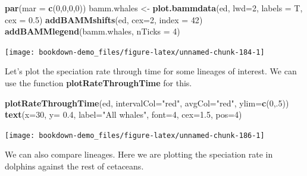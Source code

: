 \documentclass[
]{book}
\newenvironment{Shaded}{\begin{snugshade}}{\end{snugshade}}
\newcommand{\DataTypeTok}[1]{\textcolor[rgb]{0.13,0.29,0.53}{#1}}
\newcommand{\DecValTok}[1]{\textcolor[rgb]{0.00,0.00,0.81}{#1}}
\newcommand{\FloatTok}[1]{\textcolor[rgb]{0.00,0.00,0.81}{#1}}
\newcommand{\KeywordTok}[1]{\textcolor[rgb]{0.13,0.29,0.53}{\textbf{#1}}}
\newcommand{\NormalTok}[1]{#1}
\newcommand{\StringTok}[1]{\textcolor[rgb]{0.31,0.60,0.02}{#1}}
\begin{document}
\begin{Shaded}
\begin{Highlighting}[]
\KeywordTok{par}\NormalTok{(}\DataTypeTok{mar =} \KeywordTok{c}\NormalTok{(}\DecValTok{0}\NormalTok{,}\DecValTok{0}\NormalTok{,}\DecValTok{0}\NormalTok{,}\DecValTok{0}\NormalTok{))}
\NormalTok{bamm.whales \textless{}{-}}\StringTok{ }\KeywordTok{plot.bammdata}\NormalTok{(ed, }\DataTypeTok{lwd=}\DecValTok{2}\NormalTok{, }\DataTypeTok{labels =}\NormalTok{ T, }\DataTypeTok{cex =} \FloatTok{0.5}\NormalTok{)}
\KeywordTok{addBAMMshifts}\NormalTok{(ed, }\DataTypeTok{cex=}\DecValTok{2}\NormalTok{, }\DataTypeTok{index =} \DecValTok{42}\NormalTok{)}
\KeywordTok{addBAMMlegend}\NormalTok{(bamm.whales, }\DataTypeTok{nTicks =} \DecValTok{4}\NormalTok{)}
\end{Highlighting}
\end{Shaded}

\begin{center}\texttt{[image: bookdown-demo\_files/figure-latex/unnamed-chunk-184-1]} \end{center}

Let's plot the speciation rate through time for some lineages of interest. We can use the function \textbf{plotRateThroughTime} for this.

\begin{Shaded}
\begin{Highlighting}[]
\KeywordTok{plotRateThroughTime}\NormalTok{(ed, }\DataTypeTok{intervalCol=}\StringTok{"red"}\NormalTok{, }\DataTypeTok{avgCol=}\StringTok{"red"}\NormalTok{, }\DataTypeTok{ylim=}\KeywordTok{c}\NormalTok{(}\DecValTok{0}\NormalTok{,.}\DecValTok{5}\NormalTok{))}
\KeywordTok{text}\NormalTok{(}\DataTypeTok{x=}\DecValTok{30}\NormalTok{, }\DataTypeTok{y=} \FloatTok{0.4}\NormalTok{, }\DataTypeTok{label=}\StringTok{"All whales"}\NormalTok{, }\DataTypeTok{font=}\DecValTok{4}\NormalTok{, }\DataTypeTok{cex=}\FloatTok{1.5}\NormalTok{, }\DataTypeTok{pos=}\DecValTok{4}\NormalTok{)}
\end{Highlighting}
\end{Shaded}

\begin{center}\texttt{[image: bookdown-demo\_files/figure-latex/unnamed-chunk-186-1]} \end{center}

We can also compare lineages. Here we are plotting the speciation rate in dolphins against the rest of cetaceans.
\end{document}

